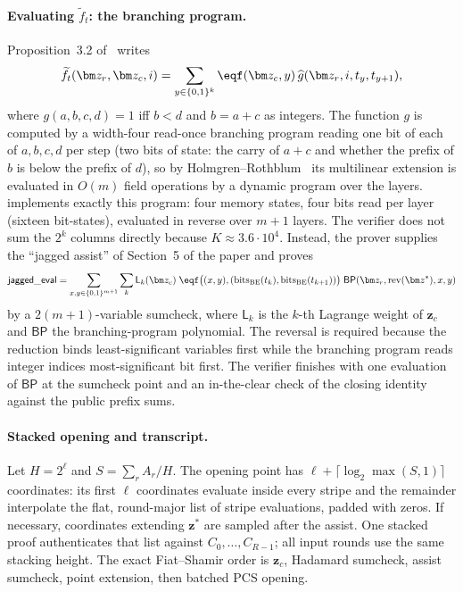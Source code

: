 \paragraph{Evaluating $\widetilde f_t$: the branching program.} Proposition~3.2 of~\citep{jagged-pcs} writes
\[
  \widetilde f_t(\bm z_r, \bm z_c, i) = \sum_{y \in \{0,1\}^{k}} \eqf(\bm z_c, y)\, \widehat g(\bm z_r, i, t_{y}, t_{y+1}),
\]
where $g(a, b, c, d) = 1$ iff $b < d$ and $b = a + c$ as integers. The function $g$ is computed by a width-four read-once branching program reading one bit of each of $a, b, c, d$ per step (two bits of state: the carry of $a + c$ and whether the prefix of $b$ is below the prefix of $d$), so by Holmgren--Rothblum~\citep{hr18} its multilinear extension is evaluated in $O(m)$ field operations by a dynamic program over the layers. \Zirenver{} implements exactly this program: four memory states, four bits read per layer (sixteen bit-states), evaluated in reverse over $m + 1$ layers. The verifier does not sum the $2^k$ columns directly because $K \approx 3.6 \cdot 10^4$. Instead, the prover supplies the ``jagged assist'' of Section~5 of the paper and proves
\[
  \mathsf{jagged\_eval} = \sum_{x, y \in \{0,1\}^{m+1}} \sum_{k} \mathsf{L}_k(\bm z_c)\; \eqf\big((x, y), (\mathrm{bits}_{\mathrm{BE}}(t_k), \mathrm{bits}_{\mathrm{BE}}(t_{k+1}))\big)\; \mathsf{BP}(\bm z_r, \operatorname{rev}(\bm z^{*}), x, y)
\]
by a $2(m+1)$-variable sumcheck, where $\mathsf L_k$ is the $k$-th Lagrange weight of $\bm z_c$ and $\mathsf{BP}$ the branching-program polynomial. The reversal is required because the reduction binds least-significant variables first while the branching program reads integer indices most-significant bit first. The verifier finishes with one evaluation of $\mathsf{BP}$ at the sumcheck point and an in-the-clear check of the closing identity against the public prefix sums.

\paragraph{Stacked opening and transcript.} Let $H=2^\ell$ and $S=\sum_r A_r/H$. The opening point has $\ell+\lceil\log_2\max(S,1)\rceil$ coordinates: its first $\ell$ coordinates evaluate inside every stripe and the remainder interpolate the flat, round-major list of stripe evaluations, padded with zeros. If necessary, coordinates extending $\bm z^*$ are sampled after the assist. One stacked \WHIR{} proof authenticates that list against $C_0,\ldots,C_{R-1}$; all input rounds use the same stacking height. The exact Fiat--Shamir order is $\bm z_c$, Hadamard sumcheck, assist sumcheck, point extension, then batched PCS opening.
